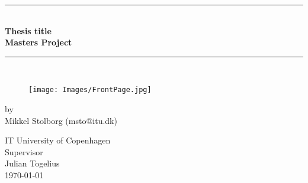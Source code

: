 \documentclass[a4paper,11pt]{article}
\begin{document}
\lstset{language=C}  
\begin{titlepage}

\centering \parindent=0pt
\newcommand{\HRule}{\rule{\textwidth}{1mm}}
 \HRule\\[1cm]\large\bfseries
Thesis title\\[0.7cm]
\large Masters Project\\[1cm]
\HRule\\[1cm]

\begin{figure}[h]
	\centering
    \texttt{[image: Images/FrontPage.jpg]}
    \label{fig:frontPage}
\end{figure}
\large by 
\\Mikkel Stolborg (msto@itu.dk)
 \normalsize
\begin{flushleft}
IT University of Copenhagen \\
Supervisor\\
Julian Togelius\\
\today \end{flushleft}
\end{titlepage}
\end{document}

